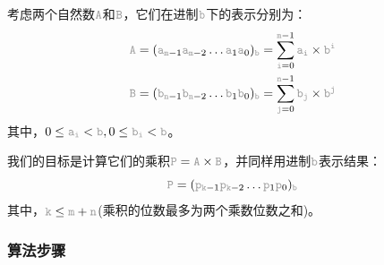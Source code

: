 \documentclass[12pt,a4paper,UTF8]{ctexart}
\newcommand{\var}[1]{\textcolor{lightgray}{\mathtt{#1}}}
\begin{document}
\qquad 考虑两个自然数$\var{A}$和$\var{B}$，它们在进制$\var{b}$下的表示分别为：
\begin{align*}
    \var{A} &= (\var{a}_{\var{m}-1}\var{a}_{\var{m}-2}\dots\var{a}_1\var{a}_0)_{\var{b}} = \sum_{\var{i}=0}^{\var{m}-1}\var{a}_{\var{i}} \times \var{b}^{\var{i}} \\
    \var{B} &= (\var{b}_{\var{n}-1}\var{b}_{\var{n}-2}\dots\var{b}_1\var{b}_0)_{\var{b}} = \sum_{\var{j}=0}^{\var{n}-1}\var{b}_{\var{j}} \times \var{b}^{\var{j}}
\end{align*}
其中，$0 \le \var{a}_{\var{i}} < \var{b}, 0 \le \var{b}_{\var{i}} < \var{b}$。

\qquad 我们的目标是计算它们的乘积$\var{P} = \var{A} \times \var{B}$，并同样用进制$\var{b}$表示结果：
\[\var{P} = (\var{p}_{\var{k}-1}\var{p}_{\var{k}-2}\dots\var{p}_1\var{p}_0)_{\var{b}}\]
其中，$\var{k} \le \var{m} + \var{n}$(乘积的位数最多为两个乘数位数之和)。

\subsubsection*{算法步骤}
\end{document}
